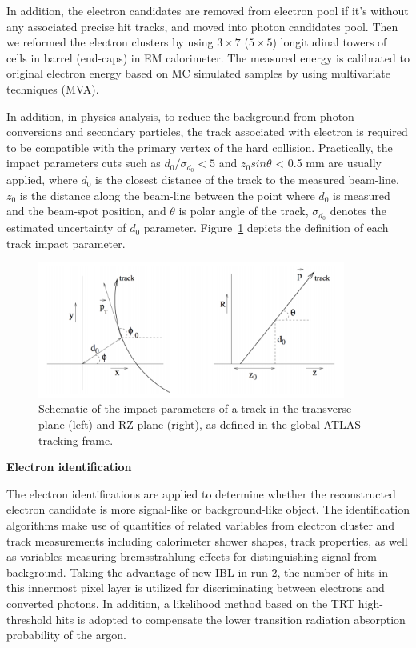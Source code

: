 \begin{enumerate}
In addition, the electron candidates are removed from electron pool if it's without any associated precise hit tracks, and moved into photon candidates pool. Then we reformed the electron clusters by using $3 \times 7$ ($5 \times 5$) longitudinal towers of cells in barrel (end-caps) in EM calorimeter. The measured energy is calibrated to original electron energy based on MC simulated samples by using multivariate techniques (MVA).
\end{enumerate}

In addition, in physics analysis, to reduce the background from photon conversions and secondary particles, the track associated with electron is required to be compatible with the primary vertex of the hard collision. 
Practically, the impact parameters cuts such as $d_{0}/\sigma_{d_{0}} < 5$ and $z_{0}sin\theta$ < 0.5 mm are usually applied, where $d_{0}$ is the closest distance of the track to the measured beam-line, $z_{0}$ is the distance along the beam-line between the point where $d_{0}$ is measured and the beam-spot position, and $\theta$ is polar angle of the track, $\sigma_{d_{0}}$ denotes the estimated uncertainty of $d_{0}$ parameter. 
Figure~\ref{fig:ele_d0z0} depicts the definition of each track impact parameter.
\begin{figure}[!htb]
  \centering
  \includegraphics[width=0.9\textwidth]{figures/Simulation/track_parameter_2d.png}
  \caption{Schematic of the impact parameters of a track in the transverse plane (left)
and RZ-plane (right), as defined in the global ATLAS tracking frame\cite{Limper:1202457}.}
  \label{fig:ele_d0z0}
\end{figure}

\textbf{Electron identification}

The electron identifications are applied to determine whether the reconstructed electron candidate is more signal-like or background-like object.
The identification algorithms make use of quantities of related variables from electron cluster and track measurements including calorimeter shower shapes, track properties, 
as well as variables measuring bremsstrahlung effects for distinguishing signal from background.
Taking the advantage of new IBL in run-2, the number of hits in this innermost pixel layer is utilized for discriminating between electrons and converted photons.
In addition, a likelihood method based on the TRT high-threshold hits is adopted to compensate the lower transition radiation absorption probability of the argon.

